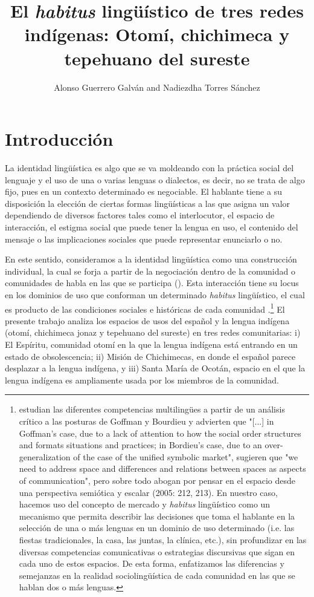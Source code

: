 \documentclass[output=paper]{../langscibook}
\author{Alonso {Guerrero Galván}\orcid{0000-0003-1751-1109}\affiliation{Instituto Nacional de Antropología e Historia (INAH)} and Nadiezdha {Torres Sánchez}\orcid{0000-0002-7774-7829}\affiliation{Universidad Nacional Autónoma de México}}
\title{El \emph{habitus} lingüístico de tres redes indígenas: Otomí, chichimeca y tepehuano del sureste}
\begin{document}
\maketitle 
{}

 \section{Introducción}


La identidad lingüística es algo que se va moldeando con la práctica social del lenguaje y el uso de una o varias lenguas o dialectos, es decir, no se trata de algo fijo, pues en un contexto determinado es negociable. El hablante tiene a su disposición la elección de ciertas formas lingüísticas a las que asigna un valor dependiendo de diversos factores tales como el interlocutor, el espacio de interacción, el estigma social que puede tener la lengua en uso, el contenido del mensaje o las implicaciones sociales que puede representar enunciarlo o no.

En este sentido, consideramos a la identidad lingüística como una construcción individual, la cual se forja a partir de la negociación dentro de la comunidad o comunidades de habla en las que se participa (\citealt{Niño-MurciaRothman2008}). Esta interacción tiene su locus en los dominios de uso que conforman un determinado \textit{habitus} lingüístico, el cual es producto de las condiciones sociales e históricas de cada comunidad \citep{Bourdieu1990}.\footnote{\citet[210]{BlommaertEtAl2005} estudian las diferentes competencias multilingües a partir de un análisis crítico a las posturas de Goffman y Bourdieu y advierten que "[...] in Goffman's case, due to a lack of attention to how the social order structures and formats situations and practices; in Bordieu's case, due to an over-generalization of the case of the unified symbolic market", sugieren que "we need to address space and differences and relations between spaces as aspects of communication", pero sobre todo abogan por pensar en el espacio desde una perspectiva semiótica y escalar (2005: 212, 213). En nuestro caso, hacemos uso del concepto de mercado y \textit{habitus} lingüístico como un mecanismo que permita describir las decisiones que toma el hablante en la selección de una o más lenguas en un dominio de uso determinado (i.e. las fiestas tradicionales, la casa, las juntas, la clínica, etc.), sin profundizar en las diversas competencias comunicativas o estrategias discursivas que sigan en cada uno de estos espacios. De esta forma, enfatizamos las diferencias y semejanzas en la realidad sociolingüística de cada comunidad en las que se hablan dos o más lenguas.} El presente trabajo analiza los espacios de usos del español y la lengua indígena (otomí, chichimeca jonaz y tepehuano del sureste) en tres redes comunitarias: i) El Espíritu, comunidad otomí en la que la lengua indígena está entrando en un estado de obsolescencia; ii) Misión de Chichimecas, en donde el español parece desplazar a la lengua indígena, y iii) Santa María de Ocotán, espacio en el que la lengua indígena es ampliamente usada por los miembros de la comunidad.
\end{document}
